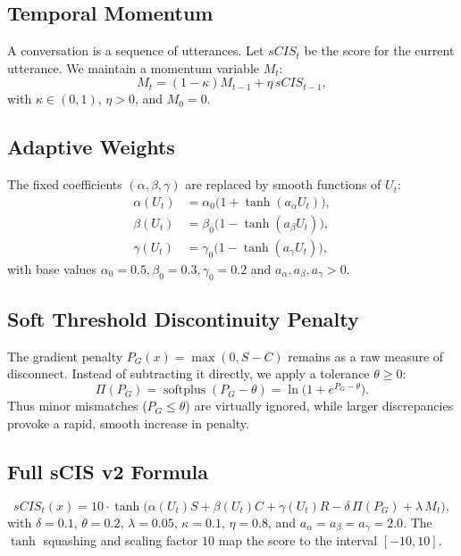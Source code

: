 \documentclass[11pt]{article}
\DeclareMathOperator{\softplus}{softplus}
\theoremstyle{definition}
\begin{document}
\subsection{Temporal Momentum}
A conversation is a sequence of utterances. Let \(sCIS_t\) be the score for the current utterance. We maintain a momentum variable \(M_t\):
\[
M_t = (1-\kappa) M_{t-1} + \eta\, sCIS_{t-1},
\]
with \(\kappa\in(0,1)\), \(\eta>0\), and \(M_0=0\).

\subsection{Adaptive Weights}
The fixed coefficients \((\alpha,\beta,\gamma)\) are replaced by smooth functions of \(U_t\):
\begin{align*}
\alpha(U_t) &= \alpha_0 \bigl(1 + \tanh(a_\alpha U_t)\bigr), \\
\beta(U_t)  &= \beta_0 \bigl(1 - \tanh(a_\beta U_t)\bigr), \\
\gamma(U_t) &= \gamma_0 \bigl(1 - \tanh(a_\gamma U_t)\bigr),
\end{align*}
with base values \(\alpha_0=0.5,\beta_0=0.3,\gamma_0=0.2\) and \(a_\alpha,a_\beta,a_\gamma>0\).

\subsection{Soft Threshold Discontinuity Penalty}
The gradient penalty \(P_G(x) = \max(0, S - C)\) remains as a raw measure of disconnect. Instead of subtracting it directly, we apply a tolerance \(\theta\ge 0\):
\[
\Pi(P_G) = \softplus(P_G - \theta) = \ln\!\bigl(1 + e^{P_G - \theta}\bigr).
\]
Thus minor mismatches (\(P_G \le \theta\)) are virtually ignored, while larger discrepancies provoke a rapid, smooth increase in penalty.

\subsection{Full sCIS v2 Formula}
\begin{equation}\label{eq:scisv2}
\boxed{
sCIS_t(x) = 10 \cdot \tanh\!\Big(
\alpha(U_t) S + \beta(U_t) C + \gamma(U_t) R
- \delta\,\Pi(P_G)
+ \lambda\, M_t
\Big)
},
\end{equation}
with \(\delta=0.1\), \(\theta=0.2\), \(\lambda=0.05\), \(\kappa=0.1\), \(\eta=0.8\), and \(a_\alpha=a_\beta=a_\gamma=2.0\). The \(\tanh\) squashing and scaling factor \(10\) map the score to the interval \([-10,10]\).
\end{document}
